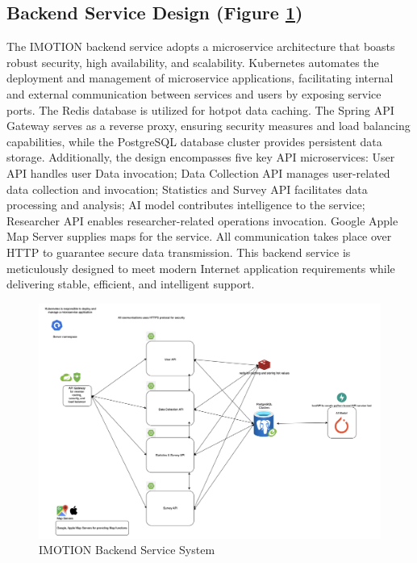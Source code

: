 \documentclass[12pt,two side]{report}
\begin{document}
\subsection{Backend Service Design (Figure \ref{figure:5})}
The IMOTION backend service adopts a microservice architecture that boasts robust security, high availability, and scalability. Kubernetes automates the deployment and management of microservice applications, facilitating internal and external communication between services and users by exposing service ports. The Redis database is utilized for hotpot data caching. The Spring API Gateway serves as a reverse proxy, ensuring security measures and load balancing capabilities, while the PostgreSQL database cluster provides persistent data storage. Additionally, the design encompasses five key API microservices: User API handles user Data invocation; Data Collection API manages user-related data collection and invocation; Statistics and Survey API facilitates data processing and analysis; AI model contributes intelligence to the service; Researcher API enables researcher-related operations invocation. Google Apple Map Server supplies maps for the service. All communication takes place over HTTP to guarantee secure data transmission. This backend service is meticulously designed to meet modern Internet application requirements while delivering stable, efficient, and intelligent support.
\begin{figure}
\centering
\includegraphics[width=12cm]{background_report/figures/backend-service-system.png}
\caption{IMOTION Backend Service System}
\label{figure:5}
\end{figure}
\end{document}
